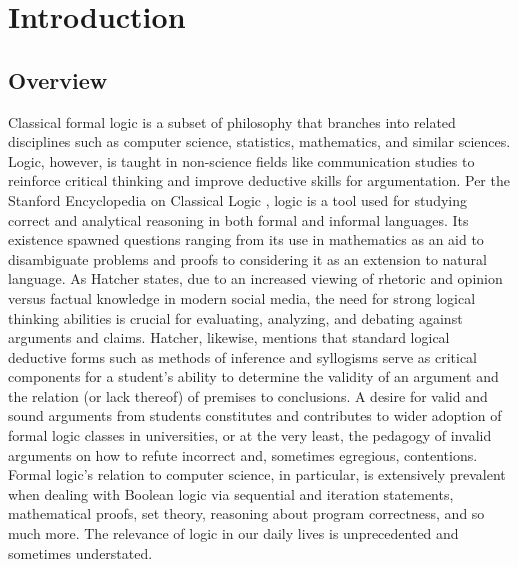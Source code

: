 \documentclass[ms]{uncgdissertationexp2}
\theoremstyle{plain}
\theoremstyle{definition}
\theoremstyle{remark}
\begin{document}
\tableofcontents 
\let\origaddvspace\addvspace
\renewcommand{\addvspace}[1]{}
\listoffigures
\listoftables
\renewcommand{\addvspace}[1]{\origaddvspace{#1}}
\doublespacing

\mainmatter %
\chapter{Introduction}\label{chapter:1}
\section{Overview}
Classical formal logic is a subset of philosophy that branches into related disciplines such as computer science, statistics, mathematics, and similar sciences. Logic, however, is taught in non-science fields like communication studies to reinforce critical thinking and improve deductive skills for argumentation. Per the Stanford Encyclopedia on Classical Logic \cite{stanfordencyclopedia}, logic is a tool used for studying correct and analytical reasoning in both formal and informal languages. Its existence spawned questions ranging from its use in mathematics as an aid to disambiguate problems and proofs to considering it as an extension to natural language. As Hatcher \cite{hatcher} states, due to an increased viewing of rhetoric and opinion versus factual knowledge in modern social media, the need for strong logical thinking abilities is crucial for evaluating, analyzing, and debating against arguments and claims. Hatcher, likewise, mentions that standard logical deductive forms such as methods of inference and syllogisms serve as critical components for a student's ability to determine the validity of an argument and the relation (or lack thereof) of premises to conclusions. A desire for valid and sound arguments from students constitutes and contributes to wider adoption of formal logic classes in universities, or at the very least, the pedagogy of invalid arguments on how to refute incorrect and, sometimes egregious, contentions.  Formal logic's relation to computer science, in particular, is extensively prevalent when dealing with Boolean logic via sequential and iteration statements, mathematical proofs, set theory, reasoning about program correctness, and so much more. The relevance of logic in our daily lives is unprecedented and sometimes understated.
\end{document}
